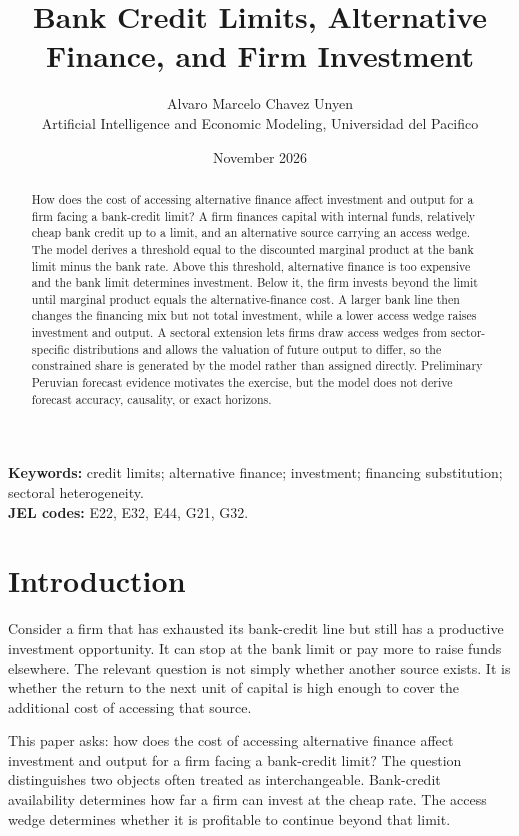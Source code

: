 \documentclass[11pt]{article}
\title{Bank Credit Limits, Alternative Finance, and Firm Investment}
\author{Alvaro Marcelo Chavez Unyen\\
\small Artificial Intelligence and Economic Modeling, Universidad del Pacifico}
\date{November 2026}
\theoremstyle{definition}
\theoremstyle{remark}
\begin{document}
\maketitle

\begin{abstract}
How does the cost of accessing alternative finance affect investment and
output for a firm facing a bank-credit limit? A firm finances capital with
internal funds, relatively cheap bank credit up to a limit, and an alternative
source carrying an access wedge. The model derives a threshold equal to the
discounted marginal product at the bank limit minus the bank rate. Above this
threshold, alternative finance is too expensive and the bank limit determines
investment. Below it, the firm invests beyond the limit until marginal product
equals the alternative-finance cost. A larger bank line then changes the
financing mix but not total investment, while a lower access wedge raises
investment and output. A sectoral extension lets firms draw access wedges from
sector-specific distributions and allows the valuation of future output to
differ, so the constrained share is generated by the model rather than
assigned directly. Preliminary Peruvian forecast evidence
motivates the exercise, but the model does not derive forecast accuracy,
causality, or exact horizons.
\end{abstract}

\noindent\textbf{Keywords:} credit limits; alternative finance; investment;
financing substitution; sectoral heterogeneity.\\
\textbf{JEL codes:} E22, E32, E44, G21, G32.

\section{Introduction}

Consider a firm that has exhausted its bank-credit line but still has a
productive investment opportunity. It can stop at the bank limit or pay more
to raise funds elsewhere. The relevant question is not simply whether another
source exists. It is whether the return to the next unit of capital is high
enough to cover the additional cost of accessing that source.

This paper asks: how does the cost of accessing alternative finance affect
investment and output for a firm facing a bank-credit limit? The question
distinguishes two objects often treated as interchangeable. Bank-credit
availability determines how far a firm can invest at the cheap rate. The
access wedge determines whether it is profitable to continue beyond that
limit.
\end{document}
